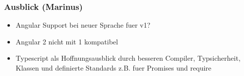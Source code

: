 \subsubsection{Ausblick (Marinus)}\label{ausblick-marinus}

\begin{itemize}
\itemsep1pt\parskip0pt
\item
  Angular Support bei neuer Sprache fuer v1?
\item
  Angular 2 nicht mit 1 kompatibel
\item
  Typescript als Hoffnungsausblick durch besseren Compiler,
  Typsicherheit, Klassen und definierte Standards z.B. fuer Promises und
  require
\end{itemize}
